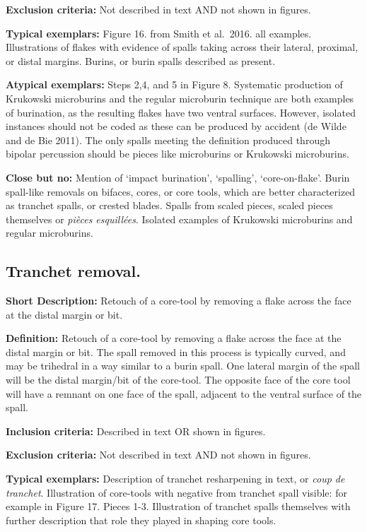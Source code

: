 \documentclass[
]{article}
\begin{document}
\textbf{Exclusion criteria:} Not described in text AND not shown in
figures.

\textbf{Typical exemplars:} Figure 16. from Smith et al.~2016. all
examples. Illustrations of flakes with evidence of spalls taking across
their lateral, proximal, or distal margins. Burins, or burin spalls
described as present.

\textbf{Atypical exemplars:} Steps 2,4, and 5 in Figure 8. Systematic
production of Krukowski microburins and the regular microburin technique
are both examples of burination, as the resulting flakes have two
ventral surfaces. However, isolated instances should not be coded as
these can be produced by accident (de Wilde and de Bie 2011). The only
spalls meeting the definition produced through bipolar percussion should
be pieces like microburins or Krukowski microburins.

\textbf{Close but no:} Mention of `impact burination', `spalling',
`core-on-flake'. Burin spall-like removals on bifaces, cores, or core
tools, which are better characterized as tranchet spalls, or crested
blades. Spalls from scaled pieces, scaled pieces themselves or
\emph{pièces esquillées}. Isolated examples of Krukowski microburins and
regular microburins.

\hypertarget{tranchet-removal.}{%
\subsection{Tranchet removal.}\label{tranchet-removal.}}

\textbf{Short Description:} Retouch of a core-tool by removing a flake
across the face at the distal margin or bit.

\textbf{Definition:} Retouch of a core-tool by removing a flake across
the face at the distal margin or bit. The spall removed in this process
is typically curved, and may be trihedral in a way similar to a burin
spall. One lateral margin of the spall will be the distal margin/bit of
the core-tool. The opposite face of the core tool will have a remnant on
one face of the spall, adjacent to the ventral surface of the spall.

\textbf{Inclusion criteria:} Described in text OR shown in figures.

\textbf{Exclusion criteria:} Not described in text AND not shown in
figures.

\textbf{Typical exemplars:} Description of tranchet resharpening in
text, or \emph{coup de tranchet}. Illustration of core-tools with
negative from tranchet spall visible: for example in Figure 17. Pieces
1-3. Illustration of tranchet spalls themselves with further description
that role they played in shaping core tools.
\end{document}
